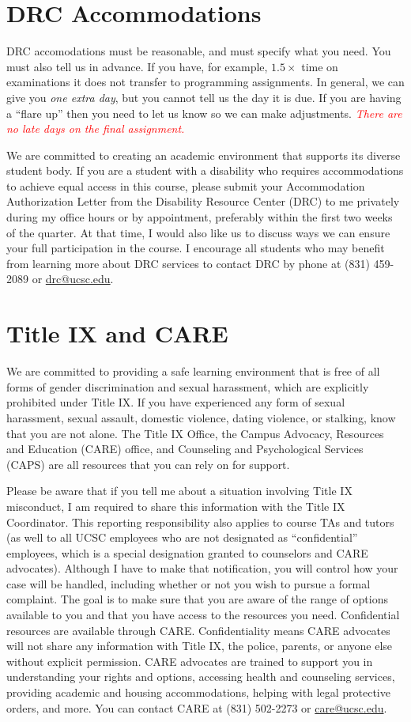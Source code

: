 \documentclass[12pt]{article}
\begin{document}
\section{DRC Accommodations}
DRC accomodations must be reasonable, and must specify what you
need. You must also tell us in advance. If you have, for example,
$1.5\times$ time on examinations it does not transfer to programming
assignments. In general, we can give you \emph{one extra day}, but
you cannot tell us the day it is due. If you are having a ``flare
up'' then you need to let us know so we can make adjustments.
\textcolor{red}{\emph{There are no late days on the final assignment.}}

We are committed to creating an academic environment that
supports its diverse student body. If you are a student with a
disability who requires accommodations to achieve equal access in
this course, please submit your Accommodation Authorization Letter
from the Disability Resource Center (DRC) to me privately during
my office hours or by appointment, preferably within the first two
weeks of the quarter. At that time, I would also like us to discuss
ways we can ensure your full participation in the course. I encourage
all students who may benefit from learning more about DRC services
to contact DRC by phone at (831) 459-2089 or \url{drc@ucsc.edu}.

\section{Title IX and CARE}
We are committed to providing a safe learning environment
that is free of all forms of gender discrimination and sexual
harassment, which are explicitly prohibited under Title IX. If you
have experienced any form of sexual harassment, sexual assault,
domestic violence, dating violence, or stalking, know that you are
not alone. The Title IX Office, the Campus Advocacy, Resources and
Education (CARE) office, and Counseling and Psychological Services
(CAPS) are all resources that you can rely on for support.

Please be aware that if you tell me about a situation involving Title IX
misconduct, I am required to share this information with the Title IX
Coordinator. This reporting responsibility also applies to course TAs and tutors
(as well to all UCSC employees who are not designated as ``confidential''
employees, which is a special designation granted to counselors and CARE
advocates). Although I have to make that notification, you will control how your
case will be handled, including whether or not you wish to pursue a formal
complaint. The goal is to make sure that you are aware of the range of options
available to you and that you have access to the resources you need.
Confidential resources are available through CARE. Confidentiality means CARE
advocates will not share any information with Title IX, the police, parents, or
anyone else without explicit permission.  CARE advocates are trained to support
you in understanding your rights and options, accessing health and counseling
services, providing academic and housing accommodations, helping with legal
protective orders, and more. You can contact CARE at (831) 502-2273 or
\url{care@ucsc.edu}.
\end{document}
